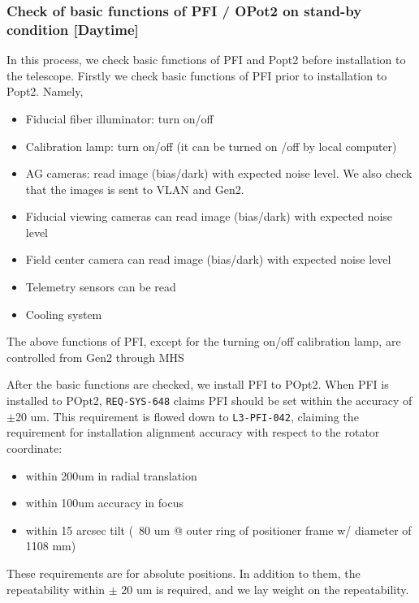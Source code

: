 \subsubsection{Check of basic functions of PFI / OPot2 on stand-by condition [Daytime]}\label{secflow:PFIoff}
In this process, we check basic functions of PFI and Popt2 before installation to the telescope.
Firstly we check basic functions of PFI prior to installation to Popt2.
Namely,
\begin{itemize}
\item Fiducial fiber illuminator: turn on/off
\item Calibration lamp: turn on/off (it can be turned on /off by local computer)
\item AG cameras: read image (bias/dark) with expected noise level.
We also check that the images is sent to VLAN and Gen2.
\item Fiducial viewing cameras can read image (bias/dark) with expected noise level
\item Field center camera can read image (bias/dark) with expected noise level
\item Telemetry sensors can be read
\item Cooling system
\end{itemize}
The above functions of PFI, except for the turning on/off calibration lamp, are controlled from Gen2 through MHS

After the basic functions are checked, we install PFI to POpt2.
When PFI is installed to POpt2, {\tt REQ-SYS-648} claims PFI should be set within the accuracy of $\pm$20 um.
This requirement is flowed down to {\tt L3-PFI-042}, claiming the requirement for installation alignment accuracy with respect to the rotator coordinate:
\begin{itemize}
\item within 200um in radial translation
\item  within 100um accuracy in focus
\item  within 15 arcsec tilt (~80 um @ outer ring of positioner frame w/ diameter of 1108 mm)
\end{itemize}
These requirements are for absolute positions.
In addition to them, the repeatability within $\pm$ 20 um is required, and we lay weight on the repeatability.

